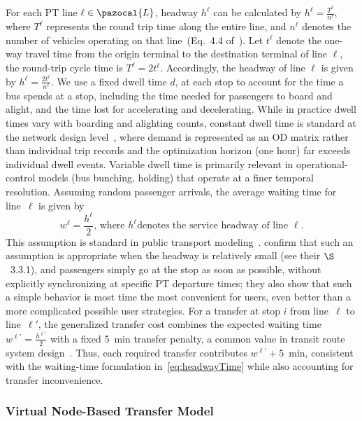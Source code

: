 \documentclass[a4paper,fleqn]{cas-sc}
\begin{document}
For each PT line $\ell \in \pazocal{L}$, headway $h^\ell$ can be calculated by $h^\ell = \frac{T^\ell}{n^\ell}$, where $T^\ell$ represents the round trip time along the entire line, and $n^\ell$ denotes the number of vehicles operating on that line~(Eq.~4.4 of~\citep{vuchic1981timed}).  
Let $t^\ell$ denote the one-way travel time from the origin terminal to the destination terminal of line $\ell$, the round-trip cycle time is $T^\ell = 2t^\ell$.
Accordingly, the headway of line $\ell$ is given by
$h^\ell = \frac{2t^\ell}{n^\ell}$.
%
We use a fixed dwell time $d$, at each stop to account for the time a bus spends at a stop, including the time needed for passengers to board and alight, and the time lost for accelerating and decelerating.
While in practice dwell times vary with boarding and alighting counts, constant dwell time is standard at the network design level~\citep{HUYNH2022392, chen2022TRSC, schobel2022cheapest}, where demand is represented as an OD matrix rather than individual trip records and the optimization horizon (one hour) far exceeds individual dwell events. Variable dwell time is primarily relevant in operational-control models (bus bunching, holding) that operate at a finer temporal resolution.
%
Assuming random passenger arrivals, the average waiting time for line~$\ell$ is given by
\begin{equation}
    w^\ell = \frac{h^\ell}{2}\text{, where }h^\ell \text{denotes the service headway of line~}\ell.
    \label{eq:headwayTime}
\end{equation}
This assumption is standard in public transport modeling~\citep{parbo2018reducing, zhang2018service}. 
\cite{liu2020does} confirm that such an assumption is appropriate when the headway is relatively small (see their $\S$~3.3.1), and passengers simply go at the stop as soon as possible, without explicitly synchronizing at specific PT departure times; they also show that such a simple behavior is most time the most convenient for users, even better than a more complicated possible user strategies.
%
For a transfer at stop $i$ from line~$\ell$ to line~$\ell'$, the generalized transfer cost combines the expected waiting time
$w^{\ell'} = \frac{h^{\ell'}}{2}$
with a fixed 5~min transfer penalty, a common value in transit route system design~\citep{baaj1991ai}. Thus, each required transfer contributes $w^{\ell'}+5$~min, consistent with the waiting-time formulation in~\eqref{eq:headwayTime} while also accounting for transfer inconvenience.

\subsubsection{Virtual Node-Based Transfer Model}\label{sec:virtual_nodes}
\end{document}
